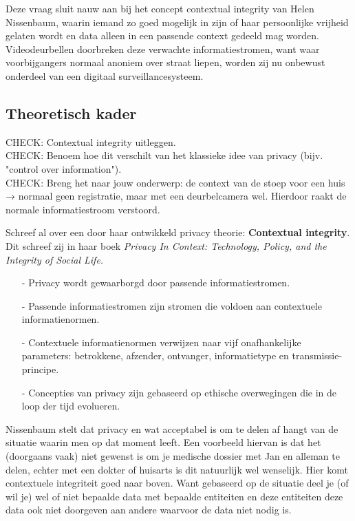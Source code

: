 \documentclass[nonacm,sigconf]{acmart}
\begin{document}

    Deze vraag sluit nauw aan bij het concept contextual integrity van Helen Nissenbaum, waarin iemand zo goed mogelijk in zijn of haar persoonlijke vrijheid gelaten wordt en data alleen in een passende context gedeeld mag worden.
    Videodeurbellen doorbreken deze verwachte informatiestromen, want waar voorbijgangers normaal anoniem over straat liepen, worden zij nu onbewust onderdeel van een digitaal surveillancesysteem.

    \subsection{Theoretisch kader}
    \begin{editorsonlyBox}
        CHECK: Contextual integrity uitleggen.\\
        CHECK: Benoem hoe dit verschilt van het klassieke idee van privacy (bijv. "control over information").\\
        CHECK: Breng het naar jouw onderwerp: de context van de stoep voor een huis → normaal geen registratie, maar met een deurbelcamera wel. Hierdoor raakt de normale informatiestroom verstoord.
    \end{editorsonlyBox}

    \parencite{nissenbaum2009privacy} Schreef al over een door haar ontwikkeld privacy theorie: \textbf{Contextual integrity}.
    Dit schreef zij in haar boek \textit{Privacy In Context: Technology, Policy, and the Integrity of Social Life.}

    \vertspace
    \begin{itemize}[leftmargin = *,listparindent =1cm]
        \item[-] Privacy wordt gewaarborgd door passende informatiestromen.
        \item[-] Passende informatiestromen zijn stromen die voldoen aan contextuele informatienormen.
        \item[-] Contextuele informatienormen verwijzen naar vijf onafhankelijke parameters: betrokkene, afzender, ontvanger, informatietype en transmissie-principe.
        \item[-] Concepties van privacy zijn gebaseerd op ethische overwegingen die in de loop der tijd evolueren.
    \end{itemize}
    \vertspace

    Nissenbaum stelt dat privacy en wat acceptabel is om te delen af hangt van de situatie waarin men op dat moment leeft.
    Een voorbeeld hiervan is dat het (doorgaans vaak) niet gewenst is om je medische dossier met Jan en alleman te delen, echter met een dokter of huisarts is dit natuurlijk wel wenselijk.
    Hier komt contextuele integriteit goed naar boven.
    Want gebaseerd op de situatie deel je (of wil je) wel of niet bepaalde data met bepaalde entiteiten en deze entiteiten deze data ook niet doorgeven aan andere waarvoor de data niet nodig is.
\end{document}
